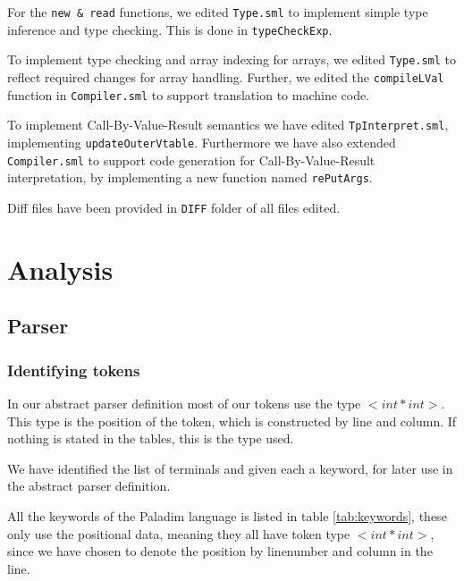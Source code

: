 \documentclass[10pt]{article}
\begin{document}
For the \texttt{new \& read} functions, we edited \texttt{Type.sml} to implement simple type inference and type checking. This is done in \texttt{typeCheckExp}.

To implement type checking and array indexing for arrays, we edited \texttt{Type.sml} to reflect required changes for array handling. Further, we edited the \texttt{compileLVal} function in \texttt{Compiler.sml} to support translation to machine code.

To implement Call-By-Value-Result semantics we have edited \texttt{TpInterpret.sml}, implementing \texttt{updateOuterVtable}. Furthermore we have also extended \texttt{Compiler.sml} to support code generation for Call-By-Value-Result interpretation, by implementing a new function named \texttt{rePutArgs}.

Diff files have been provided in \texttt{DIFF} folder of all files edited.

\section{Analysis}
\subsection{Parser}
\subsubsection{Identifying tokens}
In our abstract parser definition most of our tokens use the type $<int*int>$. This type is the position of the token, which is constructed by line and column. If nothing is stated in the tables, this is the type used.

We have identified the list of terminals and given each a keyword, for later use in the abstract parser definition.

All the keywords of the Paladim language is listed in table \ref{tab:keywords}, these only use the positional data, meaning they all have token type $<int*int>$, since we have chosen to denote the position by linenumber and column in the line.
\end{document}
